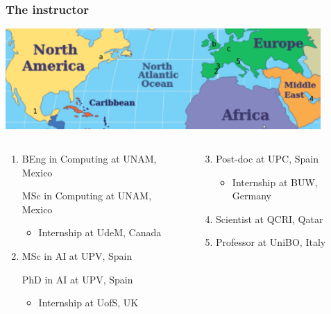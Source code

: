 \documentclass[xcolor=x11names,handout]{beamer}
\begin{document}
\begin{frame}
\frametitle{The instructor}
 
\begin{center}
\includegraphics[width=120mm]{img/01_dit_compthink_map.png}
\end{center}

\begin{columns}
\footnotesize
\begin{column}{0.5\textwidth}

\begin{enumerate}
 \item BEng in Computing at UNAM, Mexico
 
	MSc in Computing at UNAM, Mexico
	\vspace{-1mm}
	
	\begin{itemize}
	 \item Internship at UdeM, Canada
	\end{itemize}						\pause 
	
 \item MSc in AI at UPV, Spain
 
 PhD in AI at UPV, Spain
 \vspace{-1mm}
 
 \begin{itemize}
	 \item Internship at UofS, UK%
	\end{itemize}						\pause 
\end{enumerate}
\end{column}

\begin{column}{0.5\textwidth}

\begin{enumerate}\setcounter{enumi}{2}
 \item Post-doc at UPC, Spain
 \vspace{-1mm}
 
	\begin{itemize}
	 \item Internship at BUW, Germany
	\end{itemize}							\pause 

 \item Scientist at QCRI, Qatar				\pause 
 \bigskip 
 
 \item Professor at UniBO, Italy
\end{enumerate}
\vspace{1mm}
\end{column}
\end{columns}
\end{frame}
\end{document}
